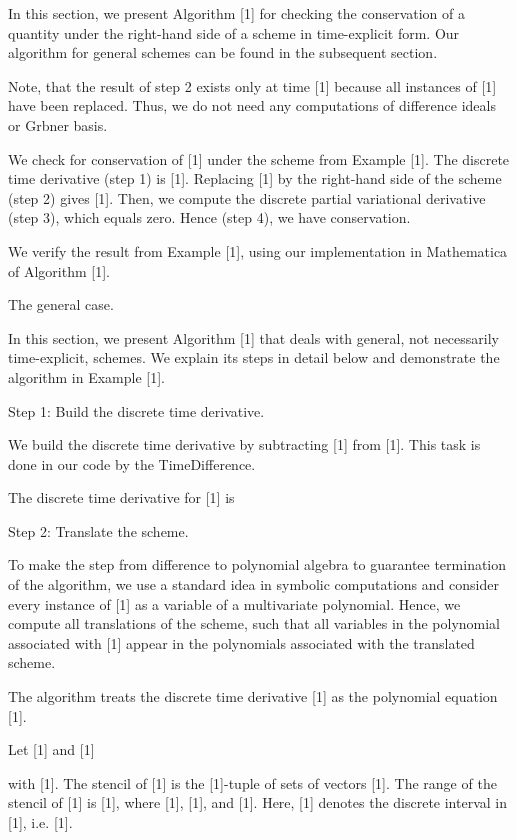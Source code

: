 \documentclass{article}
\begin{document}
In this section, we present Algorithm [1]  for checking the conservation of a quantity under the right-hand side of a scheme in time-explicit form. Our algorithm for general schemes can be found in the subsequent section.

Note, that the result of step 2 exists only at time [1] because all instances of [1] have been replaced. Thus, we do not need any computations of difference ideals or Gr{}bner basis.

	
	We check for conservation of [1] under the scheme from Example [1].
	The discrete time derivative (step 1) is
	[1].
	Replacing [1] by the right-hand side of the scheme (step 2) gives
	[1].
	Then, we compute the discrete partial variational derivative (step 3), which equals zero. Hence (step 4), we have conservation.


	
	We verify the result from Example [1], using our implementation in {Mathematica} of Algorithm [1].
	
	
		
		
	

The general case.


In this section, we present Algorithm [1] that deals with general, not necessarily time-explicit, schemes. We explain its steps in detail below and demonstrate the algorithm in Example [1].

Step 1: Build the discrete time derivative.


We build the discrete time derivative by subtracting [1] from [1]. This task is done in our code by the {TimeDifference}.
	
		The discrete time derivative for [1] is
		
		
		
			
			
		
	
Step 2: Translate the scheme.


To make the step from difference to polynomial algebra to guarantee termination of the algorithm, we use a standard idea in symbolic computations and consider every instance of [1] as a variable of a multivariate polynomial.
Hence, we compute all translations of the scheme, such that all variables in the polynomial associated with [1] appear in the polynomials associated with the translated scheme.

	The algorithm treats the discrete time derivative [1]
	as the polynomial equation [1].

	
		Let [1] and
		[1]
	
	with [1].
	The {stencil} of [1] is the [1]-tuple of sets of vectors
	[1].
	The {range} of the stencil of [1] is
		[1],
	where [1], [1],
	and [1]. Here, [1] denotes the discrete interval in [1], i.e. [1].
	
\end{document}
